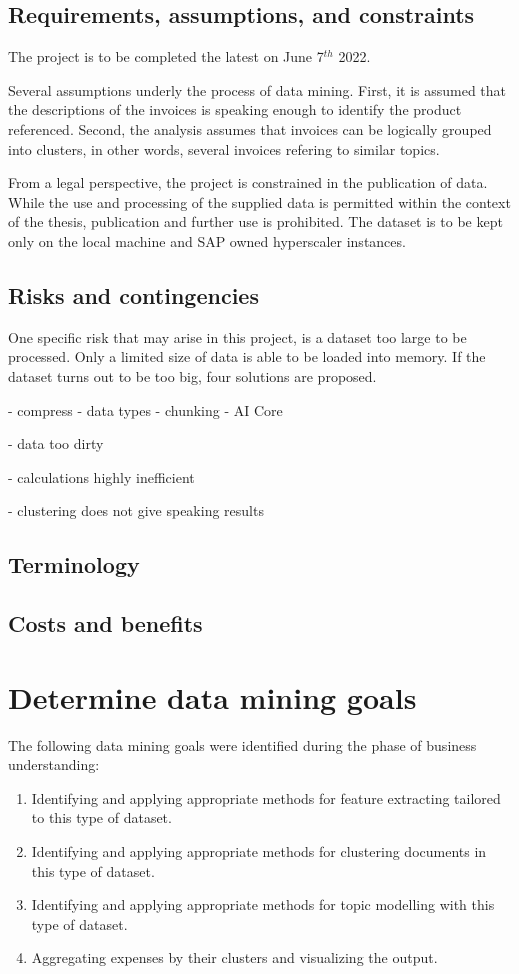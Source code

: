 \subsection{Requirements, assumptions, and constraints}
The project is to be completed the latest on June 7$^{th}$ 2022. 

Several assumptions underly the process of data mining. First, it is assumed that the descriptions of the invoices is speaking enough to identify the product referenced.
Second, the analysis assumes that invoices can be logically grouped into clusters, in other words, several invoices refering to similar topics.

From a legal perspective, the project is constrained in the publication of data. While the use and processing of the supplied data is permitted within the context of the thesis, publication and further use is prohibited. The dataset is to be kept only on the local machine and SAP owned hyperscaler instances.

\subsection{Risks and contingencies}
One specific risk that may arise in this project, is a dataset too large to be processed. Only a limited size of data is able to be loaded into memory. If the dataset turns out to be too big, four solutions are proposed.

- compress
- data types
- chunking
- AI Core

- data too dirty

- calculations highly inefficient

- clustering does not give speaking results

\subsection{Terminology}

\subsection{Costs and benefits}

\section{Determine data mining goals}
The following data mining goals were identified during the phase of business understanding:

\begin{enumerate}
\item Identifying and applying appropriate methods for feature extracting tailored to this type of dataset.
\item Identifying and applying appropriate methods for clustering documents in this type of dataset.
\item Identifying and applying appropriate methods for topic modelling with this type of dataset.
\item Aggregating expenses by their clusters and visualizing the output.
\end{enumerate}

